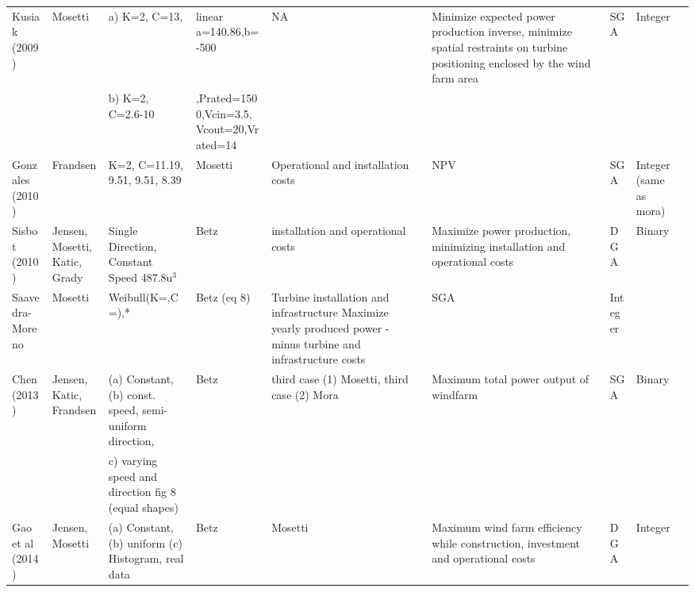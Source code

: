 \begin{sidewaystable}
\begin{center}
\begin{tabular}{l|l|l|l|l|l|l|l|l|}
Kusiak (2009)&	Mosetti & a)	K=2, C=13,  &	linear a=140.86,b=-500&	NA&	Minimize expected power production inverse, minimize spatial restraints on turbine positioning enclosed by the wind farm area&	SGA	&Integer\\
& & b) K=2, C=2.6-10 &,Prated=1500,Vcin=3.5,Vcout=20,Vrated=14 & & & &\\
Gonzales (2010)	& Frandsen	& K=2, C=11.19, 9.51, 9.51, 8.39 &	Mosetti&	Operational and installation costs&	NPV &	SGA&	Integer (same as mora)\\
Sisbot (2010)&Jensen, Mosetti, Katic, Grady&	Single Direction, Constant Speed	487.8u$^3$& Betz&	installation and operational costs&	Maximize power production, minimizing installation and operational costs	&DGA&	Binary \\
Saavedra-Moreno&	Mosetti	&Weibull(K=,C=),*&	Betz (eq 8)	&Turbine installation and infrastructure	Maximize yearly produced power - minus turbine and infrastructure costs&	SGA&Integer \\
Chen (2013)	&Jensen, Katic, Frandsen&(a) Constant, (b) const. speed, semi-uniform direction, &Betz	&third case (1) Mosetti, third case (2) Mora&	Maximum total power output of windfarm	&SGA	&Binary \\

& & c) varying speed and direction fig 8 (equal shapes) & && &  \\
Gao et al (2014)	&Jensen, Mosetti&	(a) Constant, (b) uniform (c) Histogram, real data	&Betz&	Mosetti&	Maximum wind farm efficiency while construction, investment  and operational costs	&DGA	 &Integer \\

\end{tabular} 

\end{center}
\end{sidewaystable}
